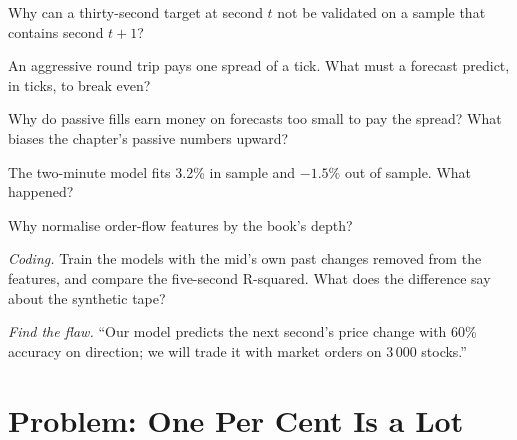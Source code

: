 \begin{exercise}[$\star$]\label{exo:s1:intraday-machine-learned-alphas:2}
Why can a thirty-second target at second $t$ not be validated on a sample that contains second $t + 1$?
\end{exercise}

\begin{exercise}[$\star$]\label{exo:s1:intraday-machine-learned-alphas:3}
An aggressive round trip pays one spread of a tick. What must a forecast predict, in ticks, to break even?
\end{exercise}

\begin{exercise}[$\star\star$]\label{exo:s1:intraday-machine-learned-alphas:4}
Why do passive fills earn money on forecasts too small to pay the spread? What biases the chapter's passive numbers upward?
\end{exercise}

\begin{exercise}[$\star\star$]\label{exo:s1:intraday-machine-learned-alphas:5}
The two-minute model fits 3.2\% in sample and $-1.5\%$ out of sample. What happened?
\end{exercise}

\begin{exercise}[$\star\star$]\label{exo:s1:intraday-machine-learned-alphas:6}
Why normalise order-flow features by the book's depth?
\end{exercise}

\begin{exercise}[$\star\star\star$]\label{exo:s1:intraday-machine-learned-alphas:7}
\emph{Coding.} Train the models with the mid's own past changes removed from the features, and compare the five-second R-squared. What does the difference
say about the synthetic tape?
\end{exercise}

\begin{exercise}[$\star\star\star$]\label{exo:s1:intraday-machine-learned-alphas:8}
\emph{Find the flaw.} ``Our model predicts the next second's price change with 60\% accuracy on direction; we will trade it with market orders on 3\,000
stocks.''
\end{exercise}

\section{Problem: One Per Cent Is a Lot}

